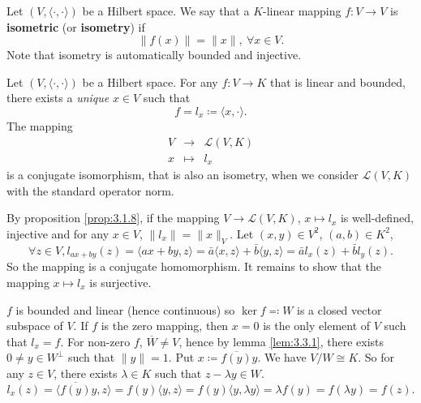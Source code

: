 \begin{definitionenv}
    Let $\left(V, \langle \cdot,\cdot\rangle\right)$ be a Hilbert space.
    We say that a $K$-linear mapping $f : V\rightarrow V$ is \textbf{isometric} (or \textbf{isometry}) if 
    $$ \| f(x)\| = \|x\|, \ \forall x\in V.$$
    Note that isometry is automatically bounded and injective.
\end{definitionenv}

\begin{theoremenv}
    Let $\left(V, \langle \cdot,\cdot\rangle\right)$ be a Hilbert space.
    For any $f: V\rightarrow K$ that is linear and bounded, there exists a \textit{unique} $x\in V$ such that
    $$ f = l_x \coloneq \langle x,\cdot\rangle.$$
    The mapping 
    $$\begin{array}{rcl}
        V & \rightarrow & \mathcal{L}(V,K)\\
        x & \mapsto & l_x
    \end{array}$$
    is a conjugate isomorphism, that is also an isometry, when we consider $\mathcal{L}(V,K)$ with the standard operator norm.
\end{theoremenv}

\begin{proofenv}
    By proposition \ref{prop:3.1.8}, if the mapping $V\rightarrow \mathcal{L}(V,K)$, $x\mapsto l_x$ is well-defined, injective and for any $x\in V$, $\| l_x\| = \| x\|_{V}$.
    Let $(x,y)\in V^2$, $(a,b)\in K^2$,
    $$ \forall z \in V, l_{ax + by} (z) = \langle ax+by, z\rangle = \bar{a} \langle x,z\rangle + \bar{b}\langle y,z\rangle = \bar{a} l_x(z) + \bar{b} l_y(z).$$
    So the mapping is a conjugate homomorphism.
    It remains to show that the mapping $x\mapsto l_x$ is surjective.

    \quad $f$ is bounded and linear (hence continuous) so $\ker f\eqcolon W$ is a closed vector subspace of $V$. 
    If $f$ is the zero mapping, then $x = 0$ is the only element of $V$ such that $l_x = f$.
    For non-zero $f$, $\overline{W}\neq V$, hence by lemma \ref{lem:3.3.1}, there exists $0\neq y\in W^\perp$ such that $\|y\| =1$.
    Put $x \coloneq \overline{f(y)}y$.
    We have $V/W \cong K$.
    So for any $z\in V$, there exists $\lambda \in K$ such that $z - \lambda y\in W$.
    $$ l_x(z) = \langle \overline{f(y)} y,z\rangle = f(y) \langle y,z\rangle = f(y) \langle y,\lambda y\rangle = \lambda f(y) = f(\lambda y) = f(z).$$
\end{proofenv}

